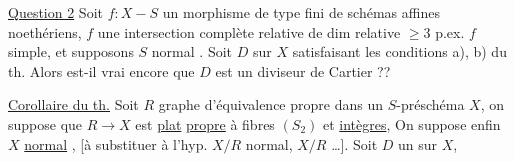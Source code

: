 \uline{Question 2} Soit $f:X\mathbin{-}S$ un morphisme  de type fini de schémas affines noethériens, $f$  une intersection complète relative de dim relative $\geq3$  p.ex. $f$ simple, et supposons $S$ normal . Soit $D$ sur $X$ satisfaisant les conditions a), b) du th. Alors est-il vrai encore que $D$ est un diviseur de Cartier ??


\uline{Corollaire du th.} Soit $R$ graphe d'équivalence propre dans un $S$-préschéma $X$, on suppose que $R\longrightarrow X$ est \uline{plat} \uline{propre} à fibres  $(S_2)$ et \uline{intègres}, On suppose enfin $X$ \uline{normal} ,  [à substituer à l'hyp. $X/R$ normal, $X/R$ \ldots]. Soit $D$ un   sur $X$,

